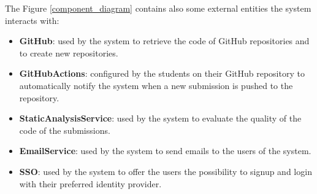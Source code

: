 The Figure \ref{component_diagram} contains also some external entities the system interacts with:
\begin{itemize}
    \item \textbf{GitHub}: used by the system to retrieve the code of GitHub repositories and to create new repositories.
    \item \textbf{GitHubActions}: configured by the students on their GitHub repository to automatically notify the system when a new submission is pushed to the repository.
    \item \textbf{StaticAnalysisService}: used by the system to evaluate the quality of the code of the submissions.
    \item \textbf{EmailService}: used by the system to send emails to the users of the system.
    \item \textbf{SSO}: used by the system to offer the users the possibility to signup and login with their preferred identity provider.
\end{itemize}

\newpage
